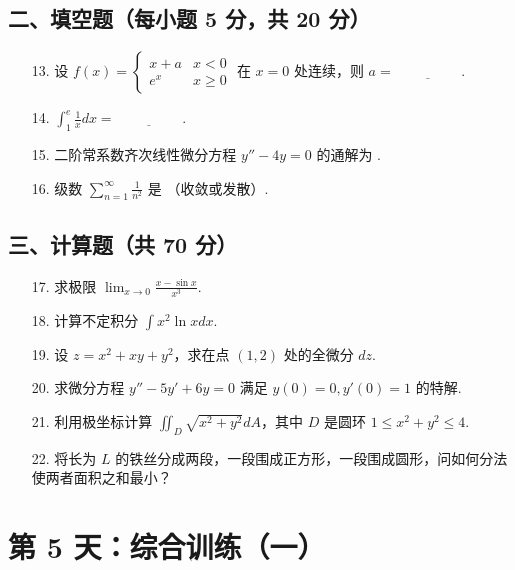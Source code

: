 \documentclass[11pt,a4paper]{article}
\begin{document}
\subsection*{二、填空题（每小题 5 分，共 20 分）}
\begin{enumerate}
    \item[13.] 设 $f(x) = \begin{cases} x+a & x < 0 \\ e^x & x \ge 0 \end{cases}$ 在 $x=0$ 处连续，则 $a = \underline{\hspace{2cm}}$.
    \item[14.] $\int_1^e \frac{1}{x} dx = \underline{\hspace{2cm}}$.
    \item[15.] 二阶常系数齐次线性微分方程 $y'' - 4y = 0$ 的通解为 \underline{\hspace{2cm}}.
    \item[16.] 级数 $\sum_{n=1}^{\infty} \frac{1}{n^2}$ 是 \underline{\hspace{2cm}}（收敛或发散）.
\end{enumerate}
\subsection*{三、计算题（共 70 分）}
\begin{enumerate}
    \item[17.] 求极限 $\lim_{x \to 0} \frac{x - \sin x}{x^3}$.
    \item[18.] 计算不定积分 $\int x^2 \ln x dx$.
    \item[19.] 设 $z = x^2 + xy + y^2$，求在点 $(1, 2)$ 处的全微分 $dz$.
    \item[20.] 求微分方程 $y'' - 5y' + 6y = 0$ 满足 $y(0)=0, y'(0)=1$ 的特解.
    \item[21.] 利用极坐标计算 $\iint_D \sqrt{x^2+y^2} dA$，其中 $D$ 是圆环 $1 \le x^2+y^2 \le 4$.
    \item[22.] 将长为 $L$ 的铁丝分成两段，一段围成正方形，一段围成圆形，问如何分法使两者面积之和最小？
\end{enumerate}

\newpage

\section*{第 5 天：综合训练（一）}
\end{document}
